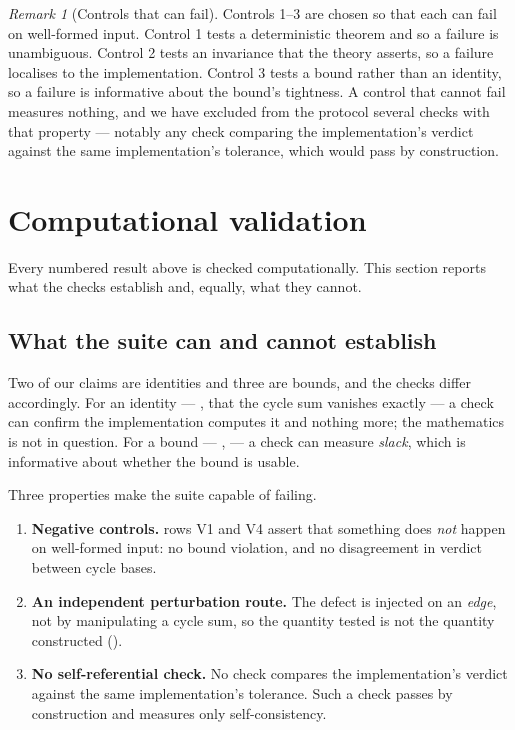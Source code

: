\documentclass[11pt,twocolumn,a4paper]{article}
\theoremstyle{pstyle}
\theoremstyle{definition}
\theoremstyle{remark}
\newtheorem{remark}[theorem]{Remark}
\begin{document}
\begin{remark}[Controls that can fail]
\label{rem:controls}
Controls 1--3 are chosen so that each can fail on well-formed input.
Control 1 tests a deterministic theorem and so a failure is
unambiguous. Control 2 tests an invariance that the theory asserts, so
a failure localises to the implementation. Control 3 tests a bound
rather than an identity, so a failure is informative about the bound's
tightness. A control that cannot fail measures nothing, and we have
excluded from the protocol several checks with that property --- notably
any check comparing the implementation's verdict against the same
implementation's tolerance, which would pass by construction.
\end{remark}

\section{Computational validation}
\label{sec:validation}

Every numbered result above is checked computationally. This section
reports what the checks establish and, equally, what they cannot.

\subsection{What the suite can and cannot establish}

Two of our claims are identities and three are bounds, and the checks
differ accordingly. For an identity --- , that the cycle
sum vanishes exactly --- a check can confirm the implementation computes
it and nothing more; the mathematics is not in question. For a bound ---
,  --- a check can measure
\emph{slack}, which is informative about whether the bound is usable.

Three properties make the suite capable of failing.

\begin{enumerate}[leftmargin=1.5em,itemsep=2pt]
\item \textbf{Negative controls.}  rows V1 and V4
assert that something does \emph{not} happen on well-formed input: no
bound violation, and no disagreement in verdict between cycle bases.
\item \textbf{An independent perturbation route.} The defect is injected
on an \emph{edge}, not by manipulating a cycle sum, so the quantity
tested is not the quantity constructed ().
\item \textbf{No self-referential check.} No check compares the
implementation's verdict against the same implementation's tolerance.
Such a check passes by construction and measures only self-consistency.
\end{enumerate}
\end{document}
